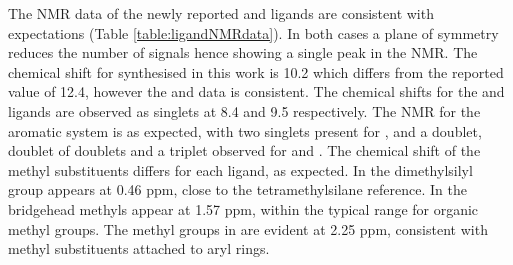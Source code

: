 {%

The NMR data of the newly reported \tButhixantphos{} and \tBusixantphos{} ligands are consistent with expectations (Table \ref{table:ligandNMRdata}).  In both cases a plane of symmetry reduces the number of signals hence showing a single peak in the \phosphorus{} NMR.  The \phosphorus{} chemical shift for \tBuxantphos{} synthesised in this work is 10.2 which differs from the reported value of 12.4\cite{Mispelaere2005}, however the \proton{} and \carbon{} data is consistent.  The \phosphorus{} chemical shifts for the \tBusixantphos{} and \tButhixantphos{} ligands are observed as singlets at 8.4 and 9.5 respectively.  The \proton{} NMR for the aromatic system is as expected, with two singlets present for \tButhixantphos, and a doublet, doublet of doublets and a triplet observed for \tBusixantphos{} and \tBuxantphos.  The chemical shift of the methyl substituents differs for each ligand, as expected.  In \tBusixantphos{} the dimethylsilyl group appears at 0.46 ppm, close to the tetramethylsilane reference.  In \tBuxantphos{} the bridgehead methyls appear at 1.57 ppm, within the typical range for organic methyl groups.  The methyl groups in \tButhixantphos{} are evident at 2.25 ppm, consistent with methyl substituents attached to aryl rings.  

}
